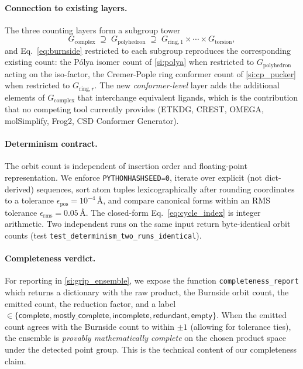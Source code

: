 \paragraph{Connection to existing layers.}
The three counting layers form a subgroup tower
\begin{equation*}
  G_{\mathrm{complex}} \;\supseteq\; G_{\mathrm{polyhedron}}
  \;\supseteq\; G_{\mathrm{ring},1} \times \cdots \times G_{\mathrm{torsion}},
\end{equation*}
and Eq.~\eqref{eq:burnside} restricted to each subgroup reproduces
the corresponding existing count: the Pólya isomer count of
\cref{si:polya} when restricted to $G_{\mathrm{polyhedron}}$
acting on the iso-factor, the Cremer-Pople ring conformer count of
\cref{si:cp_pucker} when restricted to $G_{\mathrm{ring},r}$.
The new \emph{conformer-level} layer adds the additional elements of
$G_{\mathrm{complex}}$ that interchange equivalent ligands, which is
the contribution that no competing tool currently provides
(ETKDG\cite{Riniker2015}, CREST\cite{Pracht2020},
OMEGA\cite{Hawkins2010}, molSimplify\cite{Ioannidis2016},
Frog2\cite{Miteva2010}, CSD Conformer Generator\cite{Cole2018}).

\paragraph{Determinism contract.}
The orbit count is independent of insertion order and floating-point
representation.  We enforce \texttt{PYTHONHASHSEED=0}, iterate over
explicit (not dict-derived) sequences, sort atom tuples
lexicographically after rounding coordinates to a tolerance
$\epsilon_{\mathrm{pos}} = 10^{-4}\,\text{\AA}$, and compare canonical
forms within an RMS tolerance $\epsilon_{\mathrm{rms}} = 0.05\,
\text{\AA}$.  The closed-form Eq.~\eqref{eq:cycle_index} is integer
arithmetic.  Two independent runs on the same input return
byte-identical orbit counts (test
\texttt{test\_determinism\_two\_runs\_identical}).

\paragraph{Completeness verdict.}
For reporting in
\cref{si:grip_ensemble}, we expose the function
\texttt{completeness\_report} which returns a dictionary with the
raw product, the Burnside orbit count, the emitted count, the
reduction factor, and a label
$\in \{\textsf{complete}, \textsf{mostly\_complete},
\textsf{incomplete}, \textsf{redundant}, \textsf{empty}\}$.  When
the emitted count agrees with the Burnside count to within $\pm 1$
(allowing for tolerance ties), the ensemble is \emph{provably
mathematically complete} on the chosen product space under the
detected point group.  This is the technical content of our
completeness claim.
